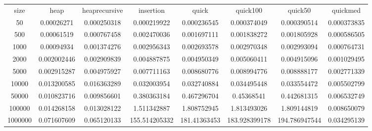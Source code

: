 \begin{table}
\begin{tabular}{cccccccc}
size & heap & heaprecursive & insertion & quick & quick100 & quick50 & quickmed \\
50 & 0.00026271 & 0.000250318 & 0.000219922 & 0.000236545 & 0.000374049 & 0.000390514 & 0.000373835 \\
500 & 0.00061519 & 0.000767458 & 0.002470036 & 0.001697111 & 0.001838272 & 0.001805928 & 0.000586505 \\
1000 & 0.00094934 & 0.001374276 & 0.002956343 & 0.002693578 & 0.002970348 & 0.002993094 & 0.000764731 \\
2000 & 0.002002446 & 0.002909839 & 0.004887875 & 0.004950349 & 0.005060411 & 0.004915096 & 0.001029495 \\
5000 & 0.002915287 & 0.004975927 & 0.007711163 & 0.008680776 & 0.008994776 & 0.008888177 & 0.002771339 \\
10000 & 0.013200585 & 0.016363289 & 0.032003954 & 0.032740884 & 0.034495448 & 0.033554472 & 0.005502799 \\
50000 & 0.010823716 & 0.009856601 & 0.380363184 & 0.467296704 & 0.45368541 & 0.442681315 & 0.006532749 \\
100000 & 0.014268158 & 0.013028122 & 1.511342887 & 1.808752945 & 1.813493026 & 1.809144819 & 0.008650079 \\
1000000 & 0.071607609 & 0.065120133 & 155.514205332 & 181.41363453 & 183.928399178 & 194.786947544 & 0.034295139 \\
\end{tabular}
\end{table}
